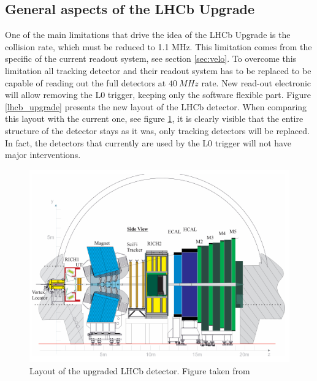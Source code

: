 \subsection{General aspects of the LHCb Upgrade}

One of the main limitations that drive the idea of the LHCb Upgrade is the collision rate, which must be reduced to 1.1 MHz. This limitation comes from the specific of the current readout system, see section \ref{sec:velo}.  To overcome this limitation all tracking detector and their readout system has to be replaced to be capable of reading out the full detectors at $40 ~MHz$ rate. New read-out electronic will allow removing the L0 trigger, keeping only the software flexible part. Figure \ref{lhcb_upgrade} presents the new layout of the LHCb detector. When comparing this layout with the current one, see figure \ref{fig:LHCBlayout}, it is clearly visible that the entire structure of the detector stays as it was, only tracking detectors will be replaced. In fact, the detectors that currently are used by the L0 trigger will not have major interventions. 

\begin{figure}[!h]
\centering
\includegraphics[width=\linewidth]{figures/LHCb_upgrade.PNG}
\caption{Layout of the upgraded LHCb detector. Figure taken from \cite{upgrade_tdr}
\label{fig:LHCBlayout}}
\end{figure}

